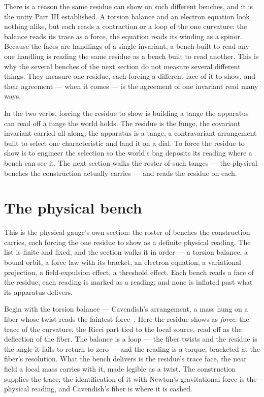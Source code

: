 There is a reason the same residue can show on such different benches, and it is the unity Part III established. A torsion
balance and an electron equation look nothing alike, but each reads a contraction or a loop of the one curvature: the balance
reads its trace as a force, the equation reads its winding as a spinor. Because the faces are handlings of a single
invariant, a bench built to read any one handling is reading the same residue as a bench built to read another. This is why
the several benches of the next section do not measure several different things. They measure one residue, each forcing a
different face of it to show, and their agreement --- when it comes --- is the agreement of one invariant read many ways.

In the two verbs, forcing the residue to show is building a tange the apparatus can read off a funge the world holds. The
residue is the funge, the covariant invariant carried all along; the apparatus is a tange, a contravariant arrangement built
to select one characteristic and land it on a dial. To force the residue to show is to engineer the selection so the world's
bag deposits its reading where a bench can see it. The next section walks the roster of such tanges --- the physical benches
the construction actually carries --- and reads the residue on each.

\section{The physical bench}

This is the physical gauge's own section: the roster of benches the construction carries, each forcing the one residue to
show as a definite physical reading. The list is finite and fixed, and the section walks it in order --- a torsion balance,
a bound orbit, a force law with its bracket, an electron equation, a variational projection, a field-expulsion effect, a
threshold effect. Each bench reads a face of the residue; each reading is marked as a reading; and none is inflated past what
its apparatus delivers.

Begin with the torsion balance --- Cavendish's arrangement, a mass hung on a fiber whose twist reads the faintest
force~\cite{cavendish1798}. Here the residue shows as \emph{force}: the trace of the curvature, the Ricci part tied to the
local source, read off as the deflection of the fiber. The balance is a loop --- the fiber twists and the residue is the
angle it fails to return to zero --- and the reading is a torque, bracketed at the fiber's resolution. What the bench
delivers is the residue's trace face, the near field a local mass carries with it, made legible as a twist. The construction
supplies the trace; the identification of it with Newton's gravitational force is the physical reading, and Cavendish's fiber
is where it is cashed.

